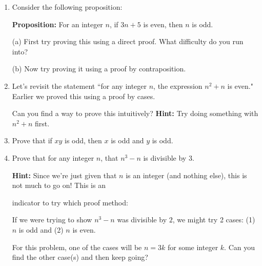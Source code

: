 \documentclass[fleqn]{article}
\theoremstyle{definition}
\begin{document}
\begin{enumerate}

\item Consider the following proposition: 

\vspace{.25cm}
    \hspace{1cm} \textbf{Proposition:} For an integer $n$, if $3n+5$ is even, then $n$ is odd. 

\vspace{.25cm}
(a) First try proving this using a direct proof. What difficulty do you run into? 

\vspace{4cm}
(b) Now try proving it using a proof by contraposition. 



\newpage

\item Let's revisit the statement ``for any integer $n$, the expression $n^2+n$ is even." Earlier we proved this using a proof by cases. 

\vspace{.25cm}
Can you find a way to prove this intuitively? \textbf{Hint:} Try doing something with $n^2+n$ first. 

\vspace{6cm}

\item Prove that if $xy$ is odd, then $x$ is odd and $y$ is odd.


\newpage 

\item Prove that for any integer $n$, that $n^3-n$ is divisible by $3$. 

    \vspace{.25cm}
    \textbf{Hint:} Since we're just given that $n$ is an integer (and nothing else), this is not much to go on! This is an 
    
    \vspace{.25cm}
    indicator to try which proof method: \underline{\hspace{6cm}}

    \vspace{.25cm}
    If we were trying to show $n^3-n$ was divisible by $2$, we might try 2 cases: (1) $n$ is odd and (2) $n$ is even.

    \vspace{.25cm}
    For this problem, one of the cases will be $n=3k$ for some integer $k$. Can you find the other case(s) and then keep going? 




\end{enumerate}
\end{document}

